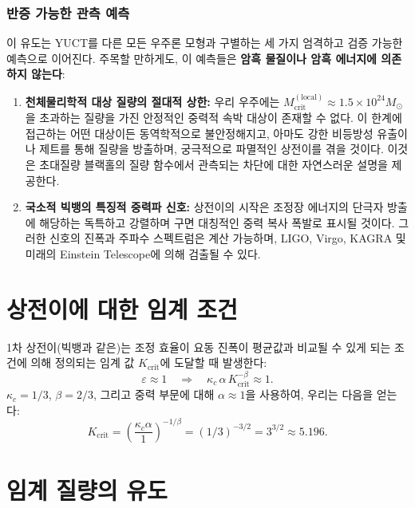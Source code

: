 \documentclass[11pt,a4paper]{article}
\newcommand{\kappac}{\kappa_c}
\newcommand{\betaf}{\beta}
\begin{document}
	\subsubsection{반증 가능한 관측 예측}
	
	이 유도는 YUCT를 다른 모든 우주론 모형과 구별하는 세 가지 엄격하고 검증 가능한 예측으로 이어진다. 주목할 만하게도, 이 예측들은 \textbf{암흑 물질이나 암흑 에너지에 의존하지 않는다}:
	
	\begin{enumerate}
		\item \textbf{천체물리학적 대상 질량의 절대적 상한:} 우리 우주에는 \(M_{\mathrm{crit}}^{\mathrm{(local)}} \approx 1.5 \times 10^{24} M_{\odot}\)을 초과하는 질량을 가진 안정적인 중력적 속박 대상이 존재할 수 없다. 이 한계에 접근하는 어떤 대상이든 동역학적으로 불안정해지고, 아마도 강한 비등방성 유출이나 제트를 통해 질량을 방출하며, 궁극적으로 파멸적인 상전이를 겪을 것이다. 이것은 초대질량 블랙홀의 질량 함수에서 관측되는 차단에 대한 자연스러운 설명을 제공한다.
		
		\item \textbf{국소적 빅뱅의 특징적 중력파 신호:} 상전이의 시작은 조정장 에너지의 단극자 방출에 해당하는 독특하고 강렬하며 구면 대칭적인 중력 복사 폭발로 표시될 것이다. 그러한 신호의 진폭과 주파수 스펙트럼은 계산 가능하며, LIGO, Virgo, KAGRA 및 미래의 Einstein Telescope에 의해 검출될 수 있다.
	\end{enumerate}
	
	\section{상전이에 대한 임계 조건}
	\label{sec:critical-condition}
	
	1차 상전이(빅뱅과 같은)는 조정 효율이 요동 진폭이 평균값과 비교될 수 있게 되는 조건에 의해 정의되는 임계 값 \(K_{\mathrm{crit}}\)에 도달할 때 발생한다:
	\begin{equation}
		\varepsilon \approx 1 \quad \Longrightarrow \quad \kappac \, \alpha \, K_{\mathrm{crit}}^{-\betaf} \approx 1.
		\label{eq:critical-condition}
	\end{equation}
	\(\kappac = 1/3\), \(\betaf = 2/3\), 그리고 중력 부문에 대해 \(\alpha \approx 1\)을 사용하여, 우리는 다음을 얻는다:
	\begin{equation}
		K_{\mathrm{crit}} = \left( \frac{\kappac \alpha}{1} \right)^{-1/\betaf} = (1/3)^{-3/2} = 3^{3/2} \approx 5.196.
		\label{eq:Kcrit}
	\end{equation}
	
	\section{임계 질량의 유도}
	\label{sec:derivation}
	
\end{document}
